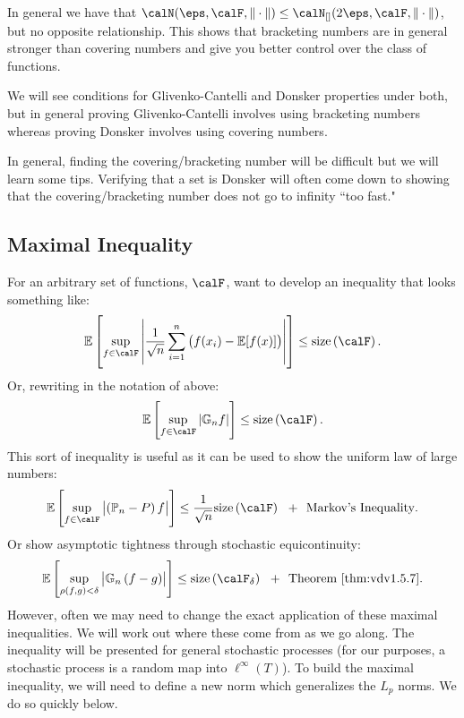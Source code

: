 \begin{remark*}
    \label{rem:bracketing-covering}
	In general we have that \(\calN(\eps,\calF,\|\cdot\|)\leq \calN_{[]}(2\eps,\calF,\|\cdot\|)\), but no opposite relationship. This shows that bracketing numbers are in general stronger than covering numbers and give you better control over the class of functions. 

	We will see conditions for Glivenko-Cantelli and Donsker properties under both, but in general proving Glivenko-Cantelli involves using bracketing numbers whereas proving Donsker involves using covering numbers.
\end{remark*}


In general, finding the covering/bracketing number will be difficult but we will learn some tips. Verifying that a set is Donsker will often come down to showing that the covering/bracketing number does not go to infinity ``too fast." 

\subsection{Maximal Inequality}%
\label{subsec:maximal}

For an arbitrary set of functions, \(\calF\), want to develop an inequality that looks something like:
\[
	\E\left[\sup_{f\in\calF}\left|\frac{1}{\sqrt{n}}\sum_{i=1}^n \left(f(x_i)-\E[f(x)]\right) \right|\right]\leq \text{size}\left(\calF\right)
.\]
Or, rewriting in the notation of above:
\[
	\E\left[\sup_{f\in\calF}\left|\mathbb{G}_nf\right|\right]\leq \text{size}\left(\calF\right)
.\] 
This sort of inequality is useful as it can be used to show the uniform law of large numbers:
\[
	\E\left[\sup_{f\in\calF}\left|\left(\P_n - P\right)f\right|\right] \leq \frac{1}{\sqrt{n}}\text{size}\left(\calF\right)\hbox{  }\text{ + }\hbox{  }\text{Markov's Inequality}
.\] 
Or show asymptotic tightness through stochastic equicontinuity:
\[
	\E\left[\sup_{\rho(f,g)<\delta}\left|\mathbb{G}_n\left(f-g\right)\right|\right] \leq \text{size}\left(\calF_\delta\right)\hbox{  }\text{ + }\hbox{  }\text{Theorem~\ref{thm:vdv1.5.7}}
.\]
However, often we may need to change the exact application of these maximal inequalities. We will work out where these come from as we go along. The inequality will be presented for general stochastic processes (for our purposes, a stochastic process is a random map into \(\ell^\infty(T)\)). To build the maximal inequality, we will need to define a new norm which generalizes the \(L_p\) norms. We do so quickly below.

